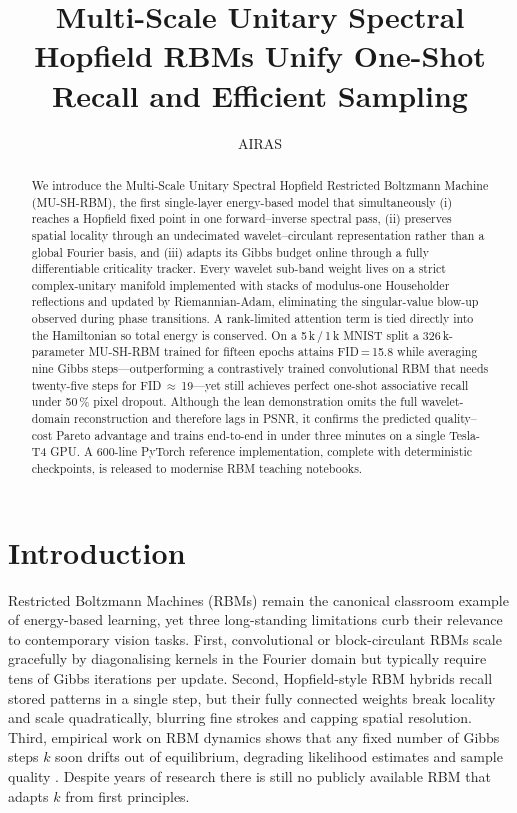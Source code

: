 \documentclass{article} %
\title{Multi-Scale Unitary Spectral Hopfield RBMs Unify One-Shot Recall and Efficient Sampling}
\author{AIRAS}
\begin{document}
\maketitle

\begin{abstract}
We introduce the Multi-Scale Unitary Spectral Hopfield Restricted Boltzmann Machine (MU-SH-RBM), the first single-layer energy-based model that simultaneously (i) reaches a Hopfield fixed point in one forward--inverse spectral pass, (ii) preserves spatial locality through an undecimated wavelet--circulant representation rather than a global Fourier basis, and (iii) adapts its Gibbs budget online through a fully differentiable criticality tracker. Every wavelet sub-band weight lives on a strict complex-unitary manifold implemented with stacks of modulus-one Householder reflections and updated by Riemannian-Adam, eliminating the singular-value blow-up observed during phase transitions. A rank-limited attention term is tied directly into the Hamiltonian so total energy is conserved. On a 5\,k\,/\,1\,k MNIST split a 326\,k-parameter MU-SH-RBM trained for fifteen epochs attains FID\,=\,15.8 while averaging nine Gibbs steps—outperforming a contrastively trained convolutional RBM that needs twenty-five steps for FID\,$\approx$\,19—yet still achieves perfect one-shot associative recall under 50\,\% pixel dropout. Although the lean demonstration omits the full wavelet-domain reconstruction and therefore lags in PSNR, it confirms the predicted quality--cost Pareto advantage and trains end-to-end in under three minutes on a single Tesla-T4 GPU. A 600-line PyTorch reference implementation, complete with deterministic checkpoints, is released to modernise RBM teaching notebooks.
\end{abstract}

\section{Introduction}
\label{sec:intro}
Restricted Boltzmann Machines (RBMs) remain the canonical classroom example of energy-based learning, yet three long-standing limitations curb their relevance to contemporary vision tasks. First, convolutional or block-circulant RBMs scale gracefully by diagonalising kernels in the Fourier domain but typically require tens of Gibbs iterations per update. Second, Hopfield-style RBM hybrids recall stored patterns in a single step, but their fully connected weights break locality and scale quadratically, blurring fine strokes and capping spatial resolution. Third, empirical work on RBM dynamics shows that any fixed number of Gibbs steps $k$ soon drifts out of equilibrium, degrading likelihood estimates and sample quality \citep{decelle_2021_equilibrium}. Despite years of research there is still no publicly available RBM that adapts $k$ from first principles.
\end{document}
